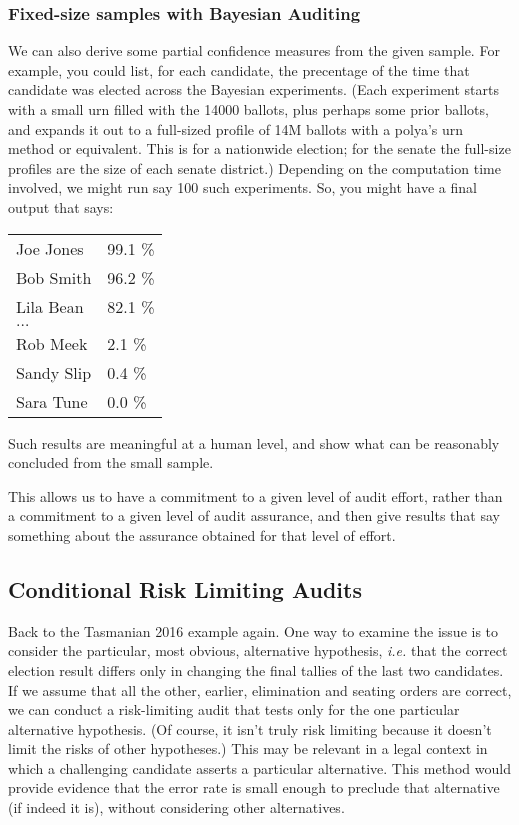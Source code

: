 \documentclass[10pt,a4paper]{article}
\begin{document}
\subsubsection{Fixed-size samples with Bayesian Auditing} 
We can also derive some partial confidence measures from the
given sample.  For example, you could list, for each candidate,
the precentage of the time that candidate was elected across the Bayesian
experiments.  (Each experiment starts with a small urn filled with
the 14000 ballots, plus perhaps some prior ballots, and expands
it out to a full-sized profile of 14M ballots with a polya's urn
method or equivalent.  This is for a nationwide election; for the
senate the full-size profiles are the size of each senate district.)
Depending on the computation time involved, we might run say
100 such experiments.  So, you might have a final output that says:

\begin{tabular}{ll}
Joe Jones    & 99.1 \% \\
Bob Smith    & 96.2 \% \\
Lila Bean      & 82.1 \% \\
$\ldots$    & \\
Rob Meek       & 2.1 \% \\ 
Sandy Slip      & 0.4 \%   \\
Sara Tune       & 0.0 \%   \\
\end{tabular}

Such results are meaningful at a human level, and show
what can be reasonably concluded from the small sample.

This allows us to have a commitment to a given
level of audit effort, rather than a commitment to a given level
of audit assurance, and then give results that say something about
the assurance obtained for that level of effort.


\subsection{Conditional Risk Limiting Audits} \label{subsec:conditional}

Back to the Tasmanian 2016 example again. One way to examine the issue is to consider the particular, most obvious, alternative hypothesis, {\it i.e.} that the correct election result differs only in changing the final tallies of the last two candidates.  If we assume that all the other, earlier, elimination and seating orders are correct, we can conduct a risk-limiting audit that tests only for the one particular alternative hypothesis.  (Of course, it isn't truly risk limiting because it doesn't limit the risks of other hypotheses.) This may be relevant in a legal context in which a challenging candidate 
asserts a particular alternative. This method would provide evidence that the error rate is small enough to preclude that alternative (if indeed it is), without considering other alternatives.
\end{document}
